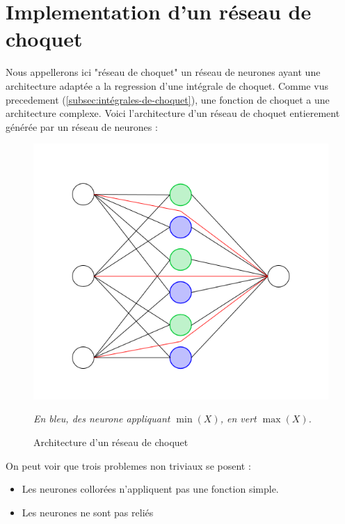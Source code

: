\section{Implementation d'un réseau de choquet}\label{sec:implementation-choquet}
Nous appellerons ici "réseau de choquet" un réseau de neurones ayant une architecture
adaptée a la regression d'une intégrale de choquet.
Comme vus precedement (\ref{subsec:intégrales-de-choquet}),
une fonction de choquet a une architecture complexe.
Voici l'architecture d'un réseau de choquet entierement générée par un réseau de neurones :

\begin{figure}[H]
    \center
    \includegraphics[height=\moyen]{pict/chnet1}
	\caption{Architecture d'un réseau de choquet}
	\label{fig:chnet1}
    \begin{center}
        \textit{
        En bleu, des neurone appliquant $\min(X)$, en vert $\max(X)$.
        }
    \end{center}
\end{figure}
\vspace{-12pt}
On peut voir que trois problemes non triviaux se posent :
\begin{itemize}
    \item Les neurones collorées n'appliquent pas une fonction simple.
    \item Les neurones ne sont pas reliés
\end{itemize}
